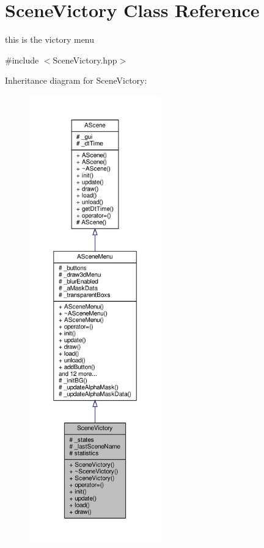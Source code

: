 \hypertarget{class_scene_victory}{}\section{Scene\+Victory Class Reference}
\label{class_scene_victory}


this is the victory menu  




{\ttfamily \#include $<$Scene\+Victory.\+hpp$>$}



Inheritance diagram for Scene\+Victory\+:
\nopagebreak
\begin{figure}[H]
\begin{center}
\leavevmode
\includegraphics[height=550pt]{class_scene_victory__inherit__graph}
\end{center}
\end{figure}


